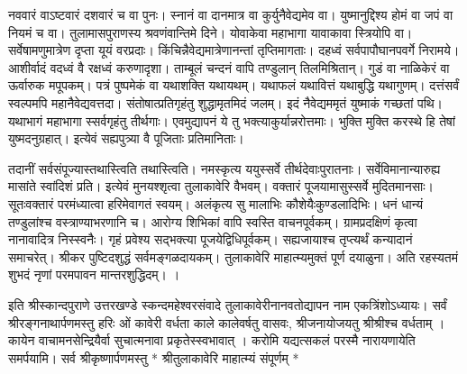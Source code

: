 नववारं वाऽष्टवारं दशवारं च वा पुनः।
 स्नानं वा दानमात्र वा कुर्युनैवेद्यमेव वा।
 युष्मानुद्दिश्य होमं वा जपं वा नियमं च वा।
 तुलामासपुराणस्य श्रवणंवान्तिमे दिने।
 योवाकेवा महाभागा यावाकावा स्त्रियोपि वा।
 सर्वेषामणुमात्रेण दृप्ता यूयं वरप्रदाः।
 किंचिन्नैवेद्यमात्रेणानन्तां तृप्तिमागताः।
 दहध्वं सर्वपापौघानपवर्गे निरामये।
 आशीर्वादं वदध्वं वै रक्षध्वं करुणादृशा।
 ताम्बूलं चन्दनं वापि तण्डुलान् तिलमिश्रितान्।
 गुडं वा नाळिकेरं वा ऊर्वारुक मपूपकम्।
 पत्रं पुष्पमेकं वा यथाशक्ति यथायथम्।
 यथाफलं यथावित्तं यथाबुद्धि यथागुणम्।
 दत्तंसर्वं स्वल्पमपि महानैवेद्यवत्तदा।
 संतोषात्प्रतिगृहंतु शुद्धामृतमिदं जलम्।
 इदं नैवेद्यममृतं युष्माकं गच्छतां पथि।
 यथाभागं महाभागा स्सर्वगृहंतु तीर्थगाः।
 एवमुद्यापनं ये तु भक्त्याकुर्यान्नरोत्तमाः।
 भुक्ति मुक्ति करस्थे हि तेषां युष्मदनुग्रहात्।
 इत्येवं सह्यपुत्र्या वै पूजिताः प्रतिमानिताः।
 
तदानीं सर्वसंपूज्यास्तथास्त्विति तथास्त्विति।
 नमस्कृत्य ययुस्सर्वे तीर्थदेवाःपुरातनाः।
 सर्वेविमानान्यारुह्य मासांते स्वांदिशं प्रति।
 इत्येवं मुनयश्शृत्वा तुलाकावेरि वैभवम्।
 वक्तारं पूजयामासुस्सर्वे मुदितमानसाः।
 सूतःवक्तारं परमंध्यात्वा हरिमेवागतं स्वयम्।
 अलंकृत्य सु मालाभिः कौशेयैःकुण्डलादिभिः।
 धनं धान्यं तण्डुलांश्च वस्त्राण्याभरणानि च।
 आरोग्य शिभिकां वापि स्वस्ति वाचनपूर्वकम्।
 ग्रामप्रदक्षिणं कृत्वा नानावादित्र निस्स्वनैः।
 गृहं प्रवेश्य सद्भक्त्या पूजयेद्विधिपूर्वकम्।
 सह्यजायाश्च तृप्त्यर्थं कन्यादानं समाचरेत्।
 श्रीकर पुष्टिदशुद्धं सर्वमङ्गळदायकम्।
 तुलाकावेरि माहात्म्यमुक्तं पूर्ण दयाळुना।
 अति रहस्यतमं शुभदं नृणां
परमपावन मान्तरशुद्धिदम्।
।

इति श्रीस्कान्दपुराणे उत्तरखण्डे स्कन्दमहेश्वरसंवादे तुलाकावेरीनानवतोद्यापन नाम 
एकत्रिंशोऽध्यायः। सर्वं श्रीरङ्गनाथार्पणमस्तु 
हरिः ओं कावेरी वर्धता काले कालेवर्षतु वासवः, श्रीजनायोजयतु श्रीश्रीश्च वर्धताम् । 
कायेन वाचामनसेन्द्रियैर्वा सुचात्मनावा प्रकृतेस्स्वभावात् । करोमि यद्यत्सकलं परस्मै नारायणायेति समर्पयामि। 
सर्व श्रीकृष्णार्पणमस्तु 
* 
श्रीतुलाकावेरि माहात्म्यं संपूर्णम् *